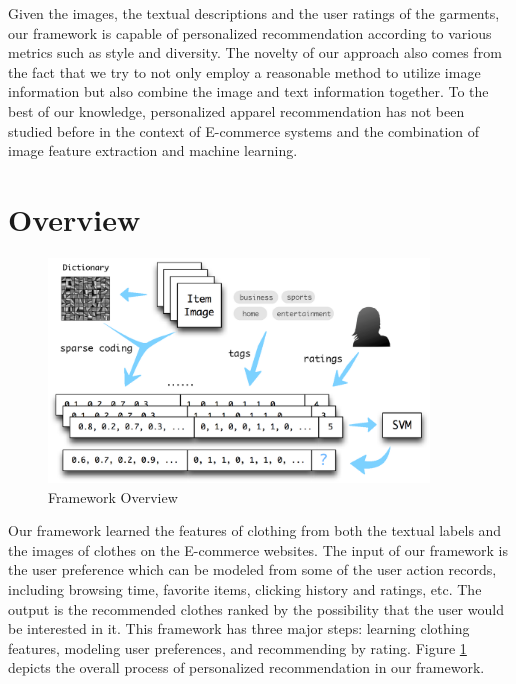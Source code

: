 Given the images, the textual descriptions and the user ratings of the garments,
  our framework is capable of personalized recommendation according to various metrics
  such as style and diversity.
The novelty of our approach also comes from the fact that
  we try to not only employ a reasonable method to utilize 
  image information but also combine the image and text information together.
To the best of our knowledge, personalized apparel recommendation has not been 
  studied before in the context of E-commerce systems and the combination of 
  image feature extraction and machine learning.

\section{Overview}\label{sec:overview}

\begin{figure}
  \centering
  \includegraphics[width=0.9\textwidth]{framework}
  \caption{Framework Overview}
  \label{fig:framework}
\end{figure}

Our framework learned the features of clothing from both the textual labels and the images of clothes on the E-commerce websites. The input of our framework is the user preference which can be modeled from some of the user action records, including browsing time, favorite items, clicking history and ratings, etc. The output is the recommended clothes ranked by the possibility that the user would be interested in it. This framework has three major steps: learning clothing features,
modeling user preferences, and recommending by rating. Figure \ref{fig:framework} depicts the overall process of personalized recommendation in our framework.

